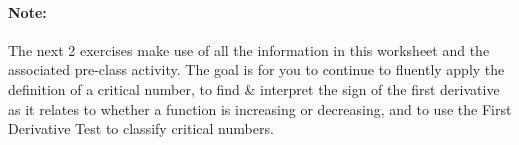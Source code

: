 \documentclass[10pt]{article}
\newcounter{exercise}[section]
\begin{document}

\vfill

\newpage

\paragraph*{Note:} The next 2 exercises make use of all the information in this worksheet and the associated pre-class activity. The goal is for you to continue to fluently apply the definition of a critical number, to find \& interpret the sign of the first derivative as it relates to whether a function is increasing or decreasing, and to use the First Derivative Test to classify critical numbers.\\
\end{document}
